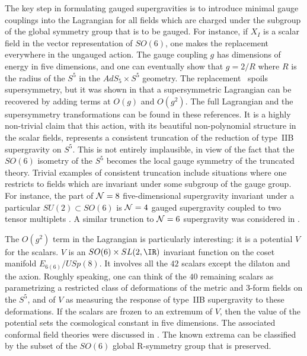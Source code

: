 The key step in formulating gauged supergravities is to introduce
minimal
gauge couplings into the Lagrangian for all fields which are charged
under
the subgroup of the global symmetry group that is to be gauged.  For
instance, if $X_I$ is a scalar field in the vector representation of
$SO(6)$, one makes the replacement
 everywhere in the ungauged action.  The gauge coupling $g$ has
 dimensions
of energy in five dimensions, and one can eventually show that $g=2/R$
where $R$ is the radius of the $S^5$ in the $AdS_5 \times S^5$
geometry.
The replacement \GaugeIt\ spoils supersymmetry, but it was shown in
\cite{Gunaydin:1986cu,Pernici:1985ju} that a supersymmetric Lagrangian
can
be recovered by adding terms at $O(g)$ and $O(g^2)$.  The full
Lagrangian
and the supersymmetry transformations can be found in these
references.  It
is a highly non-trivial claim that this action, with its beautiful
non-polynomial structure in the scalar fields, represents a consistent
truncation of the reduction of type~IIB supergravity on $S^5$.  This
is not
entirely implausible, in view of the fact that the $SO(6)$ isometry of
the
$S^5$ becomes the local gauge symmetry of the truncated theory.
Trivial
examples of consistent truncation include situations where one
restricts to
fields which are invariant under some subgroup of the gauge group.
For
instance, the part of ${\cal N}=8$ five-dimensional supergravity
invariant
under a particular $SU(2) \subset SO(6)$ is ${\cal N}=4$ gauged
supergravity coupled to two tensor multiplets \cite{Freedman:1999gp}.
A similar trunction to ${\cal N}=6$ supergravity was considered in
\cite{Ferrara:1998zt}.

The $O(g^2)$ term in the Lagrangian is particularly interesting: it is
a
potential $V$ for the scalars.  $V$ is an $SO(6) \times SL(2,\IR)$
invariant function on the coset manifold $E_{6(6)}/USp(8)$.  It
involves
all the $42$ scalars except the dilaton and the axion.  Roughly
speaking,
one can think of the $40$ remaining scalars as parametrizing a
restricted
class of deformations of the metric and 3-form fields on the
$S^5$, and of $V$ as measuring the
response of
type~IIB supergravity to these deformations.  If the scalars are
frozen to
an extremum of $V$, then the value of the potential sets the
cosmological constant in five dimensions.  The associated conformal
field theories were discussed in 
\cite{Distler:1998gb,Girardello:1998pd,Khavaev:1998fb}.  The known
extrema can be classified by the subset of the $SO(6)$ global
R-symmetry group that is preserved.








